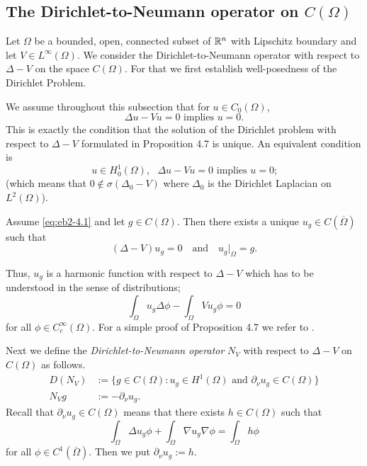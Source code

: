 \subsection{The Dirichlet-to-Neumann operator on $C(\Omega)$}

Let $\Omega$ be a bounded, open, connected subset of $\mathbb{R}^n$ with Lipschitz boundary and let $V \in L^\infty(\Omega)$. We consider the Dirichlet-to-Neumann operator with respect to $\Delta - V$ on the space $C(\Omega)$. For that we first establish well-posedness of the Dirichlet Problem.

We assume throughout this subsection that for $u \in C_{0}(\Omega)$,
\begin{equation}\label{eq:eb2-4.1} %
 \Delta u - Vu = 0 \text{ implies } u = 0.
\end{equation}
This is exactly the condition that the solution of the Dirichlet problem with respect to $\Delta - V$ formulated in Proposition 4.7 is unique. 
An equivalent condition is
\begin{equation*}%
	u \in H^1_0(\Omega), \text{ $\Delta u - Vu = 0$ implies $u = 0$;}
\end{equation*}
(which means that $0 \notin \sigma(\Delta_0 - V)$ where $\Delta_0$ is the Dirichlet Laplacian on $L^2(\Omega)$).
\begin{proposition}
Assume \eqref{eq:eb2-4.1} and let $g \in C(\Omega)$. 
Then there exists a unique $u_{g} \in C(\overline{\Omega})$ such that
\[(
	\Delta - V)u_{g} = 0 \quad \text{and} \quad u_{g}|_{\Omega} = g.
\]
\end{proposition}
Thus, $u_{g}$ is a harmonic function with respect to $\Delta - V$ which has to be understood in the sense of distributions; \ie
\[
	\int_{\Omega} u_{g} \Delta \phi - \int_\Omega V u_{g} \phi = 0 
\]
for all $\phi \in C_c^\infty(\Omega)$.
For a simple proof of Proposition 4.7 we refer to \citet{AtE19}.

Next we define the \emph{Dirichlet-to-Neumann operator} $N_{V}$ with respect to $\Delta - V$ on $C(\Omega)$ as follows.
\begin{align*}
	D(N_{V}) &:= \{g \in C(\Omega)\colon u_{g} \in H^1(\Omega)  \text{ and } \partial_\nu u_{g} \in C(\Omega)\} \\
N_{V} g &:= -\partial_\nu u_{g}.
\end{align*}
Recall that $\partial_\nu u_{g} \in C(\Omega)$ means that there exists $h \in C(\Omega)$ such that
\[\int_\Omega \Delta u_{g} \phi + \int_\Omega \nabla u_{g} \nabla\phi = \int_{\Omega} h\phi\]
for all $\phi \in C^1(\overline{\Omega})$. Then we put $\partial_\nu u_{g} := h$.

